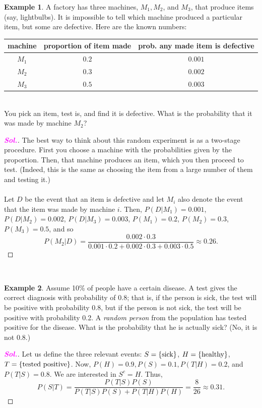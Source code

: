 \documentclass[12pt,a4paper]{article}
\theoremstyle{definition}
\newtheorem{example}{Example}[section]
\theoremstyle{definition}
\theoremstyle{definition}
\theoremstyle{definition}
\theoremstyle{remark}
\theoremstyle{definition}
\newcommand{\sol}{\textcolor{magenta}{\bf \textit{Sol.}}\quad}
\begin{document}
\begin{example}
	A factory has three machines, $M_1, M_2$, and $M_3$, that produce items (say, lightbulbs). It is impossible to tell which machine produced a particular item, but some are defective. Here are the known numbers: \begin{table}[h!]
		\centering
		\begin{tabular}{|c|c|c|}
			\toprule
			machine & proportion of item made & prob. any made item is defective\\
			\hline
			$M_1$ & $0.2$ & $0.001$\\
			\hline
			$M_2$ & $0.3$ & $0.002$\\
			\hline
			$M_3$ & $0.5$ & $0.003$\\
			\bottomrule
		\end{tabular}
	\end{table}\\ You pick an item, test is, and find it is defective. What is the probability that it was made by machine $M_2$?
	\begin{proof}[\sol]
		The best way to think about this random experiment is as a two-stage procedure. First you choose a machine with the probabilities given by the proportion. Then, that machine produces an item, which you then proceed to test. (Indeed, this is the same as choosing the item from a large number of them and testing it.)\\
		\\
		Let $D$ be the event that an item is defective and let $M_i$ also denote the event that the item was made by machine $i$. Then, $P(D|M_1)=0.001$, $P(D|M_2)=0.002$, $P(D|M_3)=0.003$, $P(M_1)=0.2$, $P(M_2)=0.3$, $P(M_3)=0.5$, and so \[
		P(M_2|D)=\frac{0.002\cdot 0.3}{0.001\cdot0.2+0.002\cdot0.3+0.003\cdot0.5}\approx 0.26.
		\]
	\end{proof}
\end{example}
\
\begin{example}
	Assume 10\% of people have a certain disease. A test gives the correct diagnosis with probability of 0.8; that is, if the person is sick, the test will be positive with probability 0.8, but if the person is not sick, the test will be positive with probability 0.2. A \textit{random person} from the population has tested positive for the disease. What is the probability that he is actually sick? (No, it is not 0.8.) \begin{proof}[\sol]
		Let us define the three relevant events: $S=\set{\text{sick}}$, $H=\set{\text{healthy}}$, $T=\set{\text{tested positive}}$. Now, $P(H)=0.9, P(S)=0.1, P(T|H)=0.2$, and $P(T|S)=0.8$. We are interested in $S^c=H$. Thus, \[
		P(S|T)=\frac{P(T|S)P(S)}{P(T|S)P(S)+P(T|H)P(H)}=\frac{8}{26}\approx0.31.
		\]
	\end{proof}
\end{example}
\end{document}
